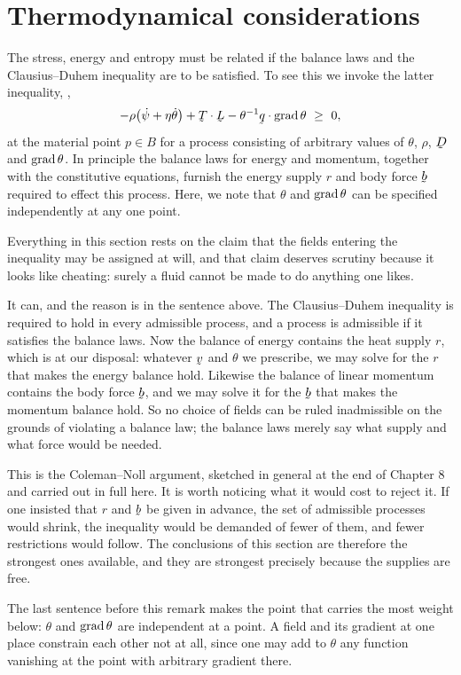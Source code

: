 \section{Thermodynamical considerations}\label{sec:ch9thermo}

The stress, energy and entropy must be related if the balance laws and
the Clausius--Duhem inequality are to be satisfied. To see this we
invoke the latter inequality, ,
\[
   -\rho\big(\dot\psi+\eta\dot\theta\big)+\ip\bT\bL
   -\theta^{-1}\ip\bq{\grad\theta}\ \geq\ 0 ,
\]
at the material point $p\in B$ for a process consisting of arbitrary
values of $\theta$, $\rho$, $\bD$ and $\operatorname{grad}\theta$. In principle the
balance laws for energy and momentum, together with the constitutive
equations, furnish the energy supply $r$ and body force $\bb$ required
to effect this process. Here, we note that $\theta$ and $\operatorname{grad}\theta$
can be specified independently at any one point.

\begin{remark}
\label{rem:ch9licence}
Everything in this section rests on the claim that the fields entering
the inequality may be assigned at will, and that claim deserves scrutiny
because it looks like cheating: surely a fluid cannot be made to do
anything one likes.

It can, and the reason is in the sentence above. The Clausius--Duhem
inequality is required to hold in every admissible process, and a
process is admissible if it satisfies the balance laws. Now the balance
of energy  contains the heat supply $r$, which is at our
disposal: whatever $\bv$ and $\theta$ we prescribe, we may solve
 for the $r$ that makes the energy balance hold. Likewise the
balance of linear momentum  contains the body force $\bb$,
and we may solve it for the $\bb$ that makes the momentum balance hold.
So no choice of fields can be ruled inadmissible on the grounds of
violating a balance law; the balance laws merely say what supply and
what force would be needed.

This is the Coleman--Noll argument, sketched in general at the end of
Chapter 8 and carried out in full here. It is worth noticing what it
would cost to reject it. If one insisted that $r$ and $\bb$ be given in
advance, the set of admissible processes would shrink, the inequality
would be demanded of fewer of them, and fewer restrictions would follow.
The conclusions of this section are therefore the strongest ones
available, and they are strongest precisely because the supplies are
free.

The last sentence before this remark makes the point that carries the
most weight below: $\theta$ and $\operatorname{grad}\theta$ are independent at a
point. A field and its gradient at one place constrain each other not at
all, since one may add to $\theta$ any function vanishing at the point
with arbitrary gradient there.
\end{remark}

